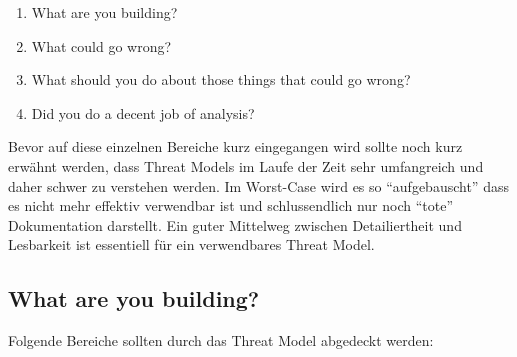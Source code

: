 \begin{enumerate}
	\item What are you building?
	\item What could go wrong?
	\item What should you do about those things that could go wrong?
	\item Did you do a decent job of analysis?
\end{enumerate}

Bevor auf diese einzelnen Bereiche kurz eingegangen wird sollte noch kurz erwähnt werden, dass Threat Models im Laufe der Zeit sehr umfangreich und daher schwer zu verstehen werden. Im Worst-Case wird es so ``aufgebauscht'' dass es nicht mehr effektiv verwendbar ist und schlussendlich nur noch ``tote'' Dokumentation darstellt. Ein guter Mittelweg zwischen Detailiertheit und Lesbarkeit ist essentiell für ein verwendbares Threat Model.

\subsection{What are you building?}

Folgende Bereiche sollten durch das Threat Model abgedeckt werden:

